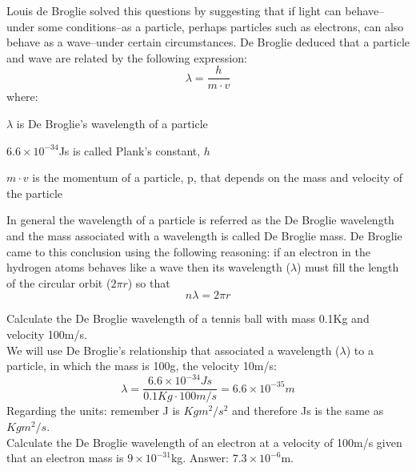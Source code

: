 \documentclass[main.tex]{subfiles}
\begin{document}
\begin{description}
\begin{minipage}[b]{1.5\linewidth}
\begin{tikzpicture}
\end{tikzpicture}
 \end{minipage}
Louis de Broglie solved this questions by suggesting that if light can behave--under some conditions--as a particle, perhaps particles such as electrons, can also behave as a wave--under certain circumstances. De Broglie deduced that a particle and wave are related by the following expression:
 \begin{equation*}
\lambda=\frac{h}{ m\cdot v}
\end{equation*}
where:
\begin{where}
 \item $\lambda$   is De Broglie's wavelength of a particle
  \item $6.6\times 10^{-34}$Js is called Plank's constant, $h$
 \item $m\cdot v$  is the momentum of a particle, p, that depends on the mass and velocity of the particle
\end{where}
In general the wavelength of a particle is referred as the De Broglie wavelength and the mass associated with a wavelength is called De Broglie mass. De Broglie came to this conclusion using the following reasoning: if an electron in the hydrogen atoms behaves like a wave then its wavelength ($\lambda$) must fill the length of the circular orbit ($2\pi r$) so that
 \begin{equation*}
n\lambda=2\pi r
\end{equation*}

\begin{example} %
Calculate the De Broglie wavelength of a tennis ball with mass 0.1Kg and velocity 100m/s.
\\
We will use De Broglie's relationship that associated a wavelength ($\lambda$) to a particle, in which the mass is 100g, the velocity 10m/s: 
\[\lambda=\frac{6.6\times 10^{-34}Js}{ 0.1Kg\cdot 100m/s}=6.6\times 10^{-35}m
\]
Regarding the units: remember J is $Kgm^2/s^2$ and therefore Js is the same as $Kgm^2/s$.
\faDiamond\ \\
Calculate the De Broglie wavelength of an electron at a velocity of 100m/s given that an electron mass is $9\times 10^{-31}$kg.
\flushright Answer: $7.3\times 10^{-6}$m. 
\end{example}%


\end{description}
\end{document}
